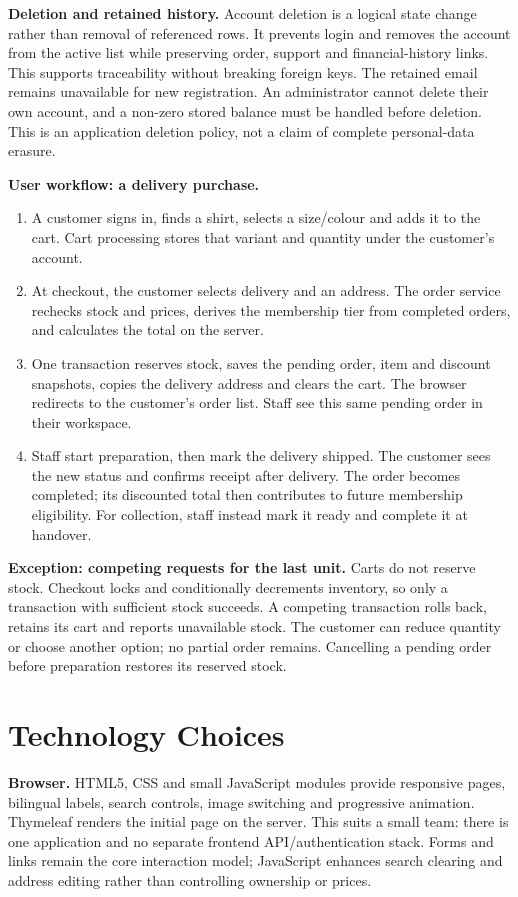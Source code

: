 \textbf{Deletion and retained history.} Account deletion is a logical state change rather than removal of referenced rows. It prevents login and removes the account from the active list while preserving order, support and financial-history links. This supports traceability without breaking foreign keys. The retained email remains unavailable for new registration. An administrator cannot delete their own account, and a non-zero stored balance must be handled before deletion. This is an application deletion policy, not a claim of complete personal-data erasure.

\newpage
\textbf{User workflow: a delivery purchase.}
\begin{enumerate}
\item A customer signs in, finds a shirt, selects a size/colour and adds it to the cart. Cart processing stores that variant and quantity under the customer's account.
\item At checkout, the customer selects delivery and an address. The order service rechecks stock and prices, derives the membership tier from completed orders, and calculates the total on the server.
\item One transaction reserves stock, saves the pending order, item and discount snapshots, copies the delivery address and clears the cart. The browser redirects to the customer's order list. Staff see this same pending order in their workspace.
\item Staff start preparation, then mark the delivery shipped. The customer sees the new status and confirms receipt after delivery. The order becomes completed; its discounted total then contributes to future membership eligibility. For collection, staff instead mark it ready and complete it at handover.
\end{enumerate}
\textbf{Exception: competing requests for the last unit.} Carts do not reserve stock. Checkout locks and conditionally decrements inventory, so only a transaction with sufficient stock succeeds. A competing transaction rolls back, retains its cart and reports unavailable stock. The customer can reduce quantity or choose another option; no partial order remains. Cancelling a pending order before preparation restores its reserved stock.

\section{Technology Choices}
\textbf{Browser.} HTML5, CSS and small JavaScript modules provide responsive pages, bilingual labels, search controls, image switching and progressive animation. Thymeleaf renders the initial page on the server. This suits a small team: there is one application and no separate frontend API/authentication stack. Forms and links remain the core interaction model; JavaScript enhances search clearing and address editing rather than controlling ownership or prices.

